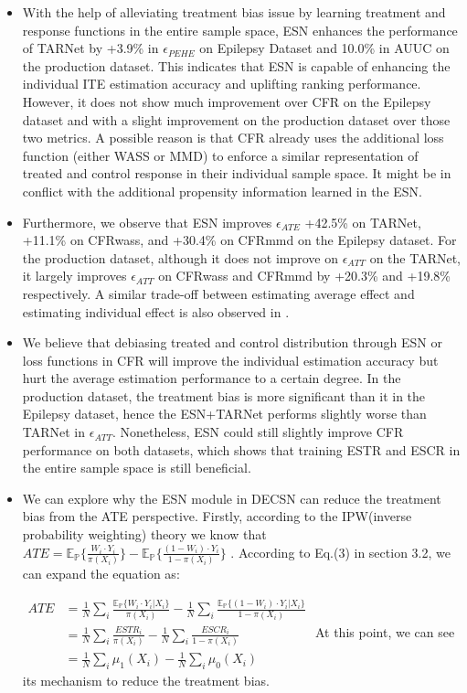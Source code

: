 \documentclass[sigconf]{acmart}
\begin{document}
\begin{itemize}
    \item With the help of alleviating treatment bias issue by learning treatment and response functions in the entire sample space, ESN enhances the performance of TARNet by +3.9\% in $\epsilon_{PEHE}$ on Epilepsy Dataset and 10.0\% in AUUC on the production dataset. This indicates that ESN is capable of enhancing the individual ITE estimation accuracy and uplifting ranking performance. However, it does not show much improvement over CFR on the Epilepsy dataset and with a slight improvement on the production dataset over those two metrics. A possible reason is that CFR already uses the additional loss function (either WASS or MMD) to enforce a similar representation of treated and control response in their individual sample space. It might be in conflict with the additional propensity information learned in the ESN.
    \item Furthermore, we observe that ESN improves $\epsilon_{ATE}$ +42.5\% on TARNet, +11.1\% on CFRwass, and +30.4\% on CFRmmd on the Epilepsy dataset. For the production dataset, although it does not improve on $\epsilon_{ATT}$ on the TARNet, it largely improves $\epsilon_{ATT}$ on CFRwass and CFRmmd by +20.3\% and +19.8\% respectively. A similar trade-off between estimating average effect and estimating individual effect is also observed in \cite{Shalit2017}. 
    \item We believe that debiasing treated and control distribution through ESN or loss functions in CFR will improve the individual estimation accuracy but hurt the average estimation performance to a certain degree. In the production dataset, the treatment bias is more significant than it in the Epilepsy dataset, hence the ESN+TARNet performs slightly worse than TARNet in $\epsilon_{ATT}$. Nonetheless, ESN could still slightly improve CFR performance on both datasets, which shows that training ESTR and ESCR in the entire sample space is still beneficial.
    \item  We can explore why the ESN module in DECSN can reduce the treatment bias from the ATE perspective. Firstly, according to the IPW(inverse probability 
 weighting)\cite{rosenbaum1983central} theory we know that  $ATE= \mathbb{E}_\mathbb{P} \{\frac{W_i \cdot Y_i}{\pi(X_i)}\}- \mathbb{E}_\mathbb{P}\{\frac{(1-W_i)\cdot  Y_i}{1-\pi(X_i)}\} $  
. According to Eq.(3) in section 3.2, we can expand the equation as: 

      $ \begin{aligned} ATE & = \frac{1}{N}  \sum_{i}  \frac{ \mathbb{E}_\mathbb{P} \{W_i\cdot Y_i|X_i\} }{\pi(X_i)} - \frac{1}{N}  \sum_{i} \frac{  \mathbb{E}_\mathbb{P}\{(1-W_i)\cdot Y_i|X_i\}} {1-\pi(X_i)} \\ 
      & = \frac{1}{N}  \sum_{i}   \frac{ ESTR_i }{\pi(X_i)} - \frac{1}{N}  \sum_{i}  \frac{  ESCR_i }{ 1- \pi(X_i)}  \\
& = \frac{1}{N}  \sum_{i}   \mu_1(X_i) - \frac{1}{N}  \sum_{i}   \mu_0(X_i) \end{aligned}  $ 
At this point, we can see its mechanism to reduce the treatment bias.
      
    
\end{itemize}
\end{document}
